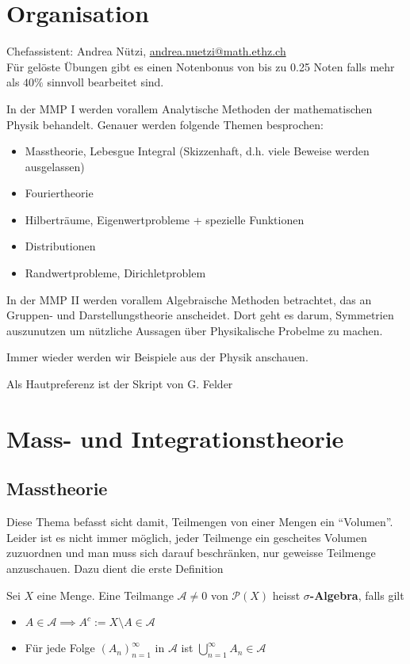 \section*{Organisation}
Chefassistent: Andrea Nützi, \href{mailto:andrea.nuetzi@math.ethz.ch}{andrea.nuetzi@math.ethz.ch}\\

Für gelöste Übungen gibt es einen Notenbonus von bis zu 0.25 Noten falls mehr als $40 \%$ sinnvoll bearbeitet sind.


In der MMP I werden vorallem Analytische Methoden der mathematischen Physik behandelt. Genauer werden folgende Themen besprochen:

\begin{itemize}
				\item Masstheorie, Lebesgue Integral (Skizzenhaft, d.h. viele Beweise werden ausgelassen)
	\item Fouriertheorie
	\item Hilberträume, Eigenwertprobleme + spezielle Funktionen
	\item	Distributionen 
	\item Randwertprobleme, Dirichletproblem
\end{itemize}

In der MMP II werden vorallem Algebraische Methoden betrachtet, das an Gruppen- und Darstellungstheorie anscheidet. Dort geht es darum, Symmetrien auszunutzen um nützliche Aussagen über Physikalische Probelme zu machen.

Immer wieder werden wir Beispiele aus der Physik anschauen.


Als Hautpreferenz ist der Skript von G. Felder


\section{Mass- und Integrationstheorie}
\subsection{Masstheorie}
Diese Thema befasst sicht damit, Teilmengen von einer Mengen ein ``Volumen''. Leider ist es nicht immer möglich, jeder Teilmenge ein gescheites Volumen zuzuordnen und man muss sich darauf beschränken, nur geweisse Teilmenge anzuschauen. Dazu dient die erste Definition

\begin{definition}
				Sei $X$ eine Menge. Eine Teilmange $ \mathcal{A} \neq 0$ von $ \mathcal{P}(X)$ heisst \textbf{$\sigma$-Algebra}, falls gilt
			\begin{itemize}
			\item	$A \in \mathcal{A} \implies A^c := X \setminus A \in \mathcal{A}$
			\item Für jede Folge $(A_n)_{n=1}^{ \infty}$ in $ \mathcal{A}$ ist $\bigcup_{n=1}^{\infty} A_n \in \mathcal{A}$
			\end{itemize}
\end{definition}

